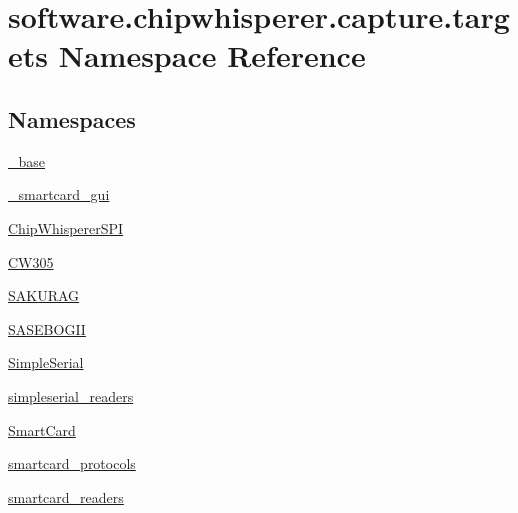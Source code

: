 \hypertarget{namespacesoftware_1_1chipwhisperer_1_1capture_1_1targets}{}\section{software.\+chipwhisperer.\+capture.\+targets Namespace Reference}
\label{namespacesoftware_1_1chipwhisperer_1_1capture_1_1targets}
\subsection*{Namespaces}
\begin{DoxyCompactItemize}
\item 
 \hyperlink{namespacesoftware_1_1chipwhisperer_1_1capture_1_1targets_1_1__base}{\+\_\+base}
\item 
 \hyperlink{namespacesoftware_1_1chipwhisperer_1_1capture_1_1targets_1_1__smartcard__gui}{\+\_\+smartcard\+\_\+gui}
\item 
 \hyperlink{namespacesoftware_1_1chipwhisperer_1_1capture_1_1targets_1_1ChipWhispererSPI}{Chip\+Whisperer\+S\+P\+I}
\item 
 \hyperlink{namespacesoftware_1_1chipwhisperer_1_1capture_1_1targets_1_1CW305}{C\+W305}
\item 
 \hyperlink{namespacesoftware_1_1chipwhisperer_1_1capture_1_1targets_1_1SAKURAG}{S\+A\+K\+U\+R\+A\+G}
\item 
 \hyperlink{namespacesoftware_1_1chipwhisperer_1_1capture_1_1targets_1_1SASEBOGII}{S\+A\+S\+E\+B\+O\+G\+I\+I}
\item 
 \hyperlink{namespacesoftware_1_1chipwhisperer_1_1capture_1_1targets_1_1SimpleSerial}{Simple\+Serial}
\item 
 \hyperlink{namespacesoftware_1_1chipwhisperer_1_1capture_1_1targets_1_1simpleserial__readers}{simpleserial\+\_\+readers}
\item 
 \hyperlink{namespacesoftware_1_1chipwhisperer_1_1capture_1_1targets_1_1SmartCard}{Smart\+Card}
\item 
 \hyperlink{namespacesoftware_1_1chipwhisperer_1_1capture_1_1targets_1_1smartcard__protocols}{smartcard\+\_\+protocols}
\item 
 \hyperlink{namespacesoftware_1_1chipwhisperer_1_1capture_1_1targets_1_1smartcard__readers}{smartcard\+\_\+readers}
\end{DoxyCompactItemize}
